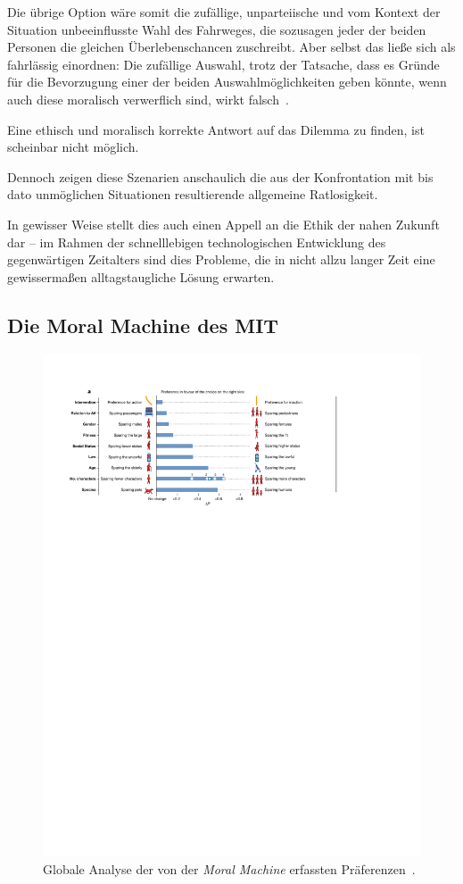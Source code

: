\documentclass[twocolumn, german]{tum-article}
\begin{document}
Die übrige Option wäre somit die zufällige, unparteiische und vom Kontext der Situation unbeeinflusste Wahl des Fahrweges, die sozusagen jeder der beiden Personen die gleichen Überlebenschancen zuschreibt.
Aber selbst das ließe sich als fahrlässig einordnen:
Die zufällige Auswahl, trotz der Tatsache, dass es Gründe für die Bevorzugung einer der beiden Auswahlmöglichkeiten geben könnte, wenn auch diese moralisch verwerflich sind, wirkt falsch~\cite[S. 71]{maurer-autonomous}.

Eine ethisch und moralisch korrekte Antwort auf das Dilemma zu finden, ist scheinbar nicht möglich.

Dennoch zeigen diese Szenarien anschaulich die aus der Konfrontation mit bis dato unmöglichen Situationen resultierende allgemeine Ratlosigkeit.

In gewisser Weise stellt dies auch einen Appell an die Ethik der nahen Zukunft dar -- im Rahmen der schnelllebigen technologischen Entwicklung des gegenwärtigen Zeitalters sind dies Probleme, die in nicht allzu langer Zeit eine gewissermaßen alltagstaugliche Lösung erwarten.


\subsection{Die Moral Machine des MIT}
\begin{figure}
	\includegraphics[width=\linewidth]{media/global-prefs-pdf}
	\caption{Globale Analyse der von der \emph{Moral Machine} erfassten Präferenzen~\cite[S. 61]{moral-machine}.}
	\label{fig:moral-preferences}
\end{figure}
\end{document}
